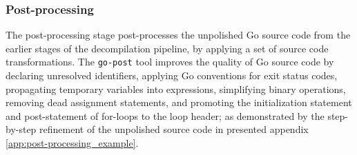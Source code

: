 
\subsubsection{Post-processing}
\label{sec:design_post-processing}

The post-processing stage post-processes the unpolished Go source code from the earlier stages of the decompilation pipeline, by applying a set of source code transformations. The \texttt{go-post} tool improves the quality of Go source code by declaring unresolved identifiers, applying Go conventions for exit status codes, propagating temporary variables into expressions, simplifying binary operations, removing dead assignment statements, and promoting the initialization statement and post-statement of for-loops to the loop header; as demonstrated by the step-by-step refinement of the unpolished source code in presented appendix \ref{app:post-processing_example}.
